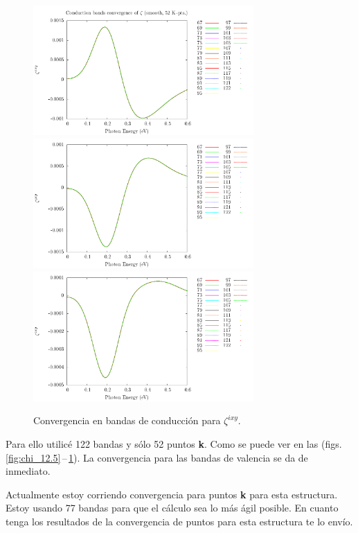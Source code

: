 \documentclass[11pt]{article}
\begin{document}
\begin{figure}
	\begin{center}
		\includegraphics[width=0.75\textwidth]{./figures/12.5/res41_zeta_1_sm_NCconv.pdf}\\
		\includegraphics[width=0.75\textwidth]{./figures/12.5/res41_zeta_2_sm_NCconv.pdf}\\
		\includegraphics[width=0.75\textwidth]{./figures/12.5/res41_zeta_3_sm_NCconv.pdf}
	\end{center}
	\caption{Convergencia en bandas de conducci\'on para $\zeta^{ixy}$.}
	\label{fig:zeta_12.5}
\end{figure}

Para ello utilic\'e 122 bandas y s\'olo 52 puntos \textbf{k}. Como se puede ver en las (figs. \ref{fig:chi_12.5}\,--\,\ref{fig:zeta_12.5}). La convergencia para las bandas de valencia se da de inmediato. 

Actualmente estoy corriendo  convergencia para puntos \textbf{k} para esta estructura. Estoy usando 77 bandas para que el c\'alculo sea lo m\'as \'agil posible. En cuanto tenga los resultados de la convergencia de puntos para esta estructura te lo env\'io.
\end{document}
